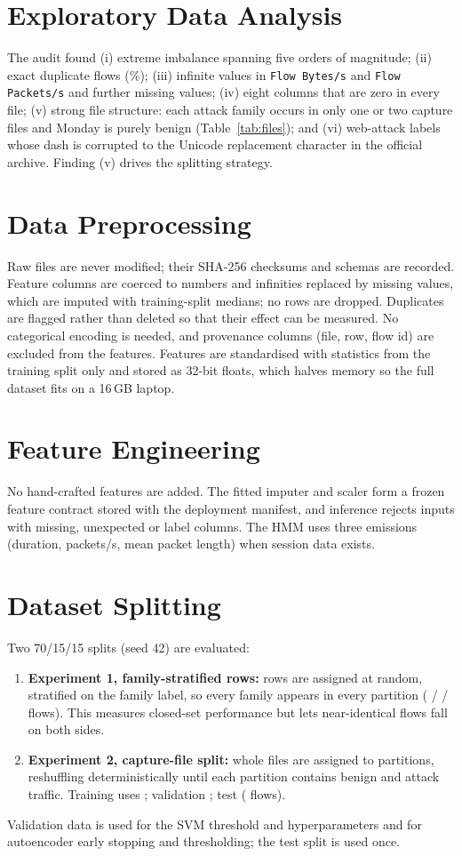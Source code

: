 \documentclass[12pt,a4paper,oneside]{report}
\begin{document}
\section{Exploratory Data Analysis}
The audit found (i) extreme imbalance spanning five orders of magnitude; (ii) \DupRows{} exact duplicate flows (\DupPct\%); (iii) \InfCount{} infinite values in \texttt{Flow Bytes/s} and \texttt{Flow Packets/s} and further missing values; (iv) eight columns that are zero in every file; (v) strong file structure: each attack family occurs in only one or two capture files and Monday is purely benign (Table~\ref{tab:files}); and (vi) web-attack labels whose dash is corrupted to the Unicode replacement character in the official archive. Finding (v) drives the splitting strategy.

\section{Data Preprocessing}
Raw files are never modified; their SHA-256 checksums and schemas are recorded. Feature columns are coerced to numbers and infinities replaced by missing values, which are imputed with training-split medians; no rows are dropped. Duplicates are flagged rather than deleted so that their effect can be measured. No categorical encoding is needed, and provenance columns (file, row, flow id) are excluded from the features. Features are standardised with statistics from the training split only and stored as 32-bit floats, which halves memory so the full dataset fits on a 16\,GB laptop.

\section{Feature Engineering}
No hand-crafted features are added. The fitted imputer and scaler form a frozen feature contract stored with the deployment manifest, and inference rejects inputs with missing, unexpected or label columns. The HMM uses three emissions (duration, packets/s, mean packet length) when session data exists.

\section{Dataset Splitting}
Two 70/15/15 splits (seed 42) are evaluated:
\begin{enumerate}
    \item \textbf{Experiment 1, family-stratified rows:} rows are assigned at random, stratified on the family label, so every family appears in every partition (\EoneTrain{} / \EoneVal{} / \EoneTest{} flows). This measures closed-set performance but lets near-identical flows fall on both sides.
    \item \textbf{Experiment 2, capture-file split:} whole files are assigned to partitions, reshuffling deterministically until each partition contains benign and attack traffic. Training uses \EtwoTrainFiles; validation \EtwoValFiles; test \EtwoTestFiles{} (\EtwoTestRows{} flows).
\end{enumerate}
Validation data is used for the SVM threshold and hyperparameters and for autoencoder early stopping and thresholding; the test split is used once.
\end{document}
